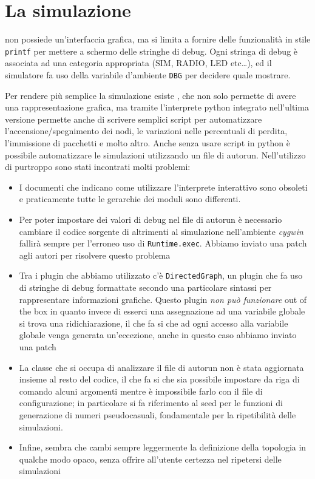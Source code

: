 \documentclass[twoside,11pt,a4paper,italian,openany]{book}
\begin{document}
\section{La simulazione}

\tos non possiede un'interfaccia grafica, ma si limita a fornire delle funzionalità in stile 
\texttt{printf} per mettere a schermo delle stringhe di debug. 
Ogni stringa di debug è associata ad una categoria appropriata (SIM, RADIO, LED etc\ldots), 
ed il simulatore fa uso della variabile d'ambiente \texttt{DBG} per decidere quale mostrare. 

Per rendere più semplice la simulazione esiste \tv, che non solo permette di avere una 
rappresentazione grafica, ma tramite l'interprete python integrato nell'ultima versione 
permette anche di scrivere semplici script per automatizzare l'accensione/spegnimento dei nodi,
le variazioni nelle percentuali di perdita, l'immissione di pacchetti e molto altro. 
Anche senza usare script in python è possibile automatizzare le simulazioni utilizzando un file 
di autorun.
Nell'utilizzo di \tv purtroppo sono stati incontrati molti problemi:
\begin{itemize}
\item{I documenti che indicano come utilizzare l'interprete interattivo sono obsoleti e 
praticamente tutte le gerarchie dei moduli sono differenti.}
\item{Per poter impostare dei valori di debug nel file di autorun è necessario  
cambiare il codice sorgente di \tv altrimenti al simulazione nell'ambiente \emph{cygwin} 
fallirà sempre per l'erroneo uso di \texttt{Runtime.exec}. Abbiamo inviato una patch 
agli autori per risolvere questo problema}
\item{Tra i plugin  che abbiamo utilizzato c'è \texttt{DirectedGraph}, un plugin che fa uso 
di stringhe di debug formattate secondo una particolare sintassi per rappresentare informazioni 
grafiche. Questo plugin \emph{non può funzionare} out of the box in quanto invece di esserci 
una assegnazione ad una variabile globale si trova una ridichiarazione, il che fa si che 
ad ogni accesso alla variabile globale venga generata un'eccezione, anche in questo caso abbiamo inviato una patch}
\item{La classe che si occupa di analizzare il file di autorun non è stata aggiornata insieme 
al resto del codice, il che fa si che sia possibile impostare da riga di comando alcuni 
argomenti mentre è impossibile farlo con il file di configurazione; 
in particolare si fa riferimento al seed per le funzioni di generazione di numeri pseudocasuali, 
fondamentale per la ripetibilità delle simulazioni.}
\item{Infine, sembra che \tv cambi sempre leggermente la definizione della topologia in qualche modo opaco, senza offrire all'utente certezza nel ripetersi delle simulazioni}
\end{itemize}
\end{document}
